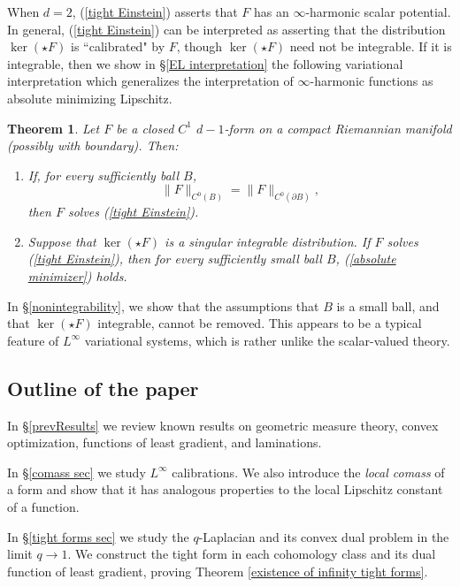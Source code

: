\documentclass[reqno,11pt]{amsart}
\newcommand{\dfn}[1]{\emph{#1}\index{#1}}
\newtheorem{mainthm}{Theorem}
\theoremstyle{definition}
\numberwithin{equation}{section}
\begin{document}
When $d = 2$, (\ref{tight Einstein}) asserts that $F$ has an $\infty$-harmonic scalar potential.
In general, (\ref{tight Einstein}) can be interpreted as asserting that the distribution $\ker(\star F)$ is ``calibrated" by $F$, though $\ker(\star F)$ need not be integrable.
If it is integrable, then we show in \S\ref{EL interpretation} the following variational interpretation which generalizes the interpretation of $\infty$-harmonic functions as absolute minimizing Lipschitz.

\begin{mainthm}\label{tight are absolute minimizers}
Let $F$ be a closed $C^1$ $d - 1$-form on a compact Riemannian manifold (possibly with boundary). Then:
\begin{enumerate}
\item If, for every sufficiently ball $B$,
\begin{equation}\label{absolute minimizer}
\|F\|_{C^0(B)} = \|F\|_{C^0(\partial B)},
\end{equation}
then $F$ solves (\ref{tight Einstein}).
\item Suppose that $\ker(\star F)$ is a singular integrable distribution. If $F$ solves (\ref{tight Einstein}), then for every sufficiently small ball $B$, (\ref{absolute minimizer}) holds.
\end{enumerate}
\end{mainthm}

In \S\ref{nonintegrability}, we show that the assumptions that $B$ is a small ball, and that $\ker(\star F)$ integrable, cannot be removed.
This appears to be a typical feature of $L^\infty$ variational systems, which is rather unlike the scalar-valued theory.

\subsection{Outline of the paper}
In \S\ref{prevResults} we review known results on geometric measure theory, convex optimization, functions of least gradient, and laminations.

In \S\ref{comass sec} we study $L^\infty$ calibrations. We also introduce the \dfn{local comass} of a form and show that it has analogous properties to the local Lipschitz constant of a function.

In \S\ref{tight forms sec} we study the $q$-Laplacian and its convex dual problem in the limit $q \to 1$. We construct the tight form in each cohomology class and its dual function of least gradient, proving Theorem \ref{existence of infinity tight forms}.
\end{document}
